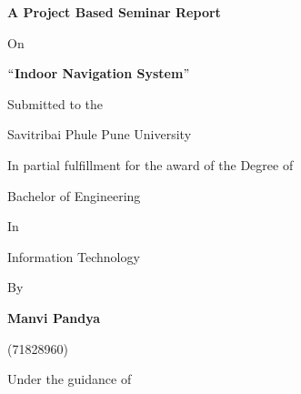 ﻿\documentclass[a4paper, 12pt]{article}
\begin{document}
\begin{titlepage}
\hspace{15pt}
\begin{center}
\textbf{{\Large A Project Based Seminar Report}}
\end{center}

\begin{center}
On
\end{center}

\begin{center}
{\fontsize{18pt}{21.6pt}\selectfont \textbf{\textcolor[HTML]{FF0000}{$``$Indoor Navigation System$"$ }}}
\end{center}

\begin{center}
Submitted to the
\end{center}

\begin{center}
{\large Savitribai Phule Pune University }
\end{center}

\begin{center}
In partial fulfillment for the award of the Degree of
\end{center}

\begin{center}
{\large Bachelor of Engineering }
\end{center}

\begin{center}
In
\end{center}

\begin{center}
{\large Information Technology}
\end{center}

\begin{center}
By
\end{center}

\begin{center}
{\fontsize{16pt}{19.2pt}\selectfont \textbf{\textcolor[HTML]{FF0000}{Manvi Pandya}}\par}
\end{center}

\begin{center}
\textcolor[HTML]{FF0000}{(71828960)}
\end{center}

\begin{center}
Under the guidance of
\end{center}


\end{titlepage}
\end{document}
